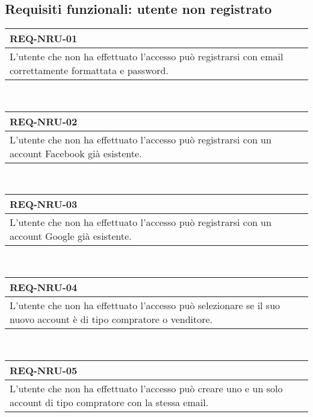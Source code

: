         \subsection{Requisiti funzionali: utente non registrato}
        \begin{tabular}{|p{}|}
            \hline
            \multicolumn{1}{|l|}{\cellcolor{head}\textbf{REQ-NRU-01}} \\
            \hline
            L'utente che non ha effettuato l'accesso può registrarsi con email correttamente formattata e password. \\
            \hline
        \end{tabular} \smallskip \\
        \begin{tabular}{|p{}|}
            \hline
            \multicolumn{1}{|l|}{\cellcolor{head}\textbf{REQ-NRU-02}} \\
            \hline
            L'utente che non ha effettuato l'accesso può registrarsi con un account Facebook già esistente. \\
            \hline
        \end{tabular} \smallskip \\
        \begin{tabular}{|p{}|}
            \hline
            \multicolumn{1}{|l|}{\cellcolor{head}\textbf{REQ-NRU-03}} \\
            \hline
            L'utente che non ha effettuato l'accesso può registrarsi con un account Google già esistente. \\
            \hline
        \end{tabular} \smallskip \\
        \begin{tabular}{|p{}|}
            \hline
            \multicolumn{1}{|l|}{\cellcolor{head}\textbf{REQ-NRU-04}} \\
            \hline
            L'utente che non ha effettuato l'accesso può selezionare se il suo nuovo account è di tipo compratore o venditore. \\
            \hline
        \end{tabular} \smallskip \\
        \begin{tabular}{|p{}|}
            \hline
            \multicolumn{1}{|l|}{\cellcolor{head}\textbf{REQ-NRU-05}} \\
            \hline
            L'utente che non ha effettuato l'accesso può creare uno e un solo account di tipo compratore con la stessa email. \\
            \hline
        \end{tabular} \smallskip \\
